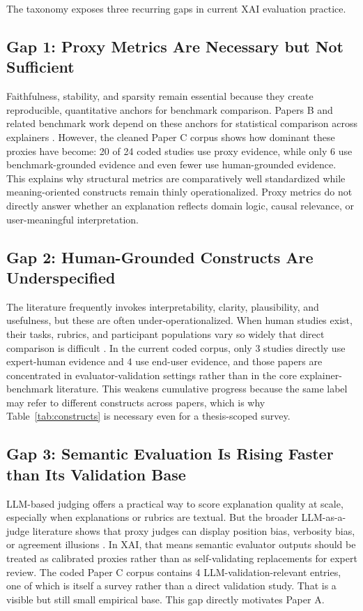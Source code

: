 \documentclass[twoside,11pt]{article}
\begin{document}
The taxonomy exposes three recurring gaps in current XAI evaluation
practice.

\subsection{Gap 1: Proxy Metrics Are Necessary but Not Sufficient}

Faithfulness, stability, and sparsity remain essential because they
create reproducible, quantitative anchors for benchmark comparison.
Papers B and related benchmark work depend on these anchors for
statistical comparison across explainers
\citep{agarwal2022openxai,hedstrom2023quantus,canha2025functionally}.
However, the cleaned Paper C corpus shows how dominant these proxies
have become: 20 of 24 coded studies use proxy evidence, while only 6 use
benchmark-grounded evidence and even fewer use human-grounded evidence.
This explains why structural metrics are comparatively well standardized
while meaning-oriented constructs remain thinly operationalized. Proxy
metrics do not directly answer whether an explanation reflects domain
logic, causal relevance, or user-meaningful interpretation.

\subsection{Gap 2: Human-Grounded Constructs Are Underspecified}

The literature frequently invokes interpretability, clarity,
plausibility, and usefulness, but these are often
under-operationalized. When human studies exist, their tasks, rubrics,
and participant populations vary so widely that direct comparison is
difficult \citep{ali2023trustworthy,longo2024manifesto}. In the current
coded corpus, only 3 studies directly use expert-human evidence and 4
use end-user evidence, and those papers are concentrated in
evaluator-validation settings rather than in the core
explainer-benchmark literature. This weakens cumulative progress because
the same label may refer to different constructs across papers, which is
why Table~\ref{tab:constructs} is necessary even for a thesis-scoped
survey.

\subsection{Gap 3: Semantic Evaluation Is Rising Faster than Its Validation Base}

LLM-based judging offers a practical way to score explanation quality at
scale, especially when explanations or rubrics are textual. But the
broader LLM-as-a-judge literature shows that proxy judges can display
position bias, verbosity bias, or agreement illusions
\citep{zheng2023judging,gu2024llmjudge}. In XAI, that means semantic
evaluator outputs should be treated as calibrated proxies rather than as
self-validating replacements for expert review. The coded Paper C corpus
contains 4 LLM-validation-relevant entries, one of which is itself a
survey rather than a direct validation study. That is a visible but
still small empirical base. This gap directly motivates Paper A.
\end{document}
